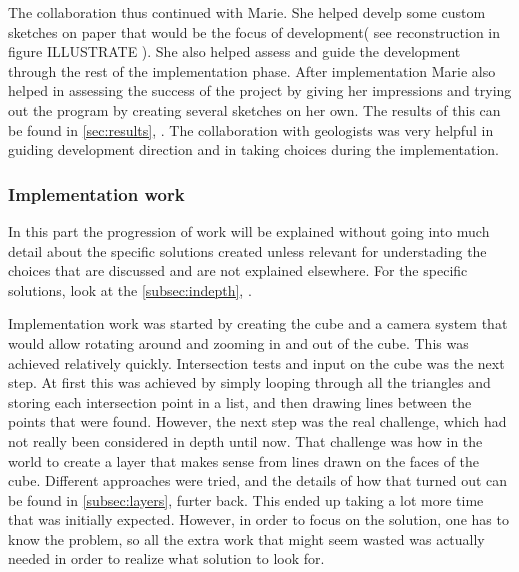 \documentclass[a4paper,12pt]{article}
\newcommand{\secref}[1]{\autoref{#1}, \nameref{#1}}
\begin{document}
The collaboration thus continued with Marie. She helped develp some custom sketches on paper that would be the focus of development( see reconstruction in figure ILLUSTRATE ). She also helped assess and guide the development through the rest of the implementation phase. After implementation Marie also helped in assessing the success of the project by giving her impressions and trying out the program by creating several sketches on her own. The results of this can be found in \secref{sec:results}. The collaboration with geologists was very helpful in guiding development direction and in taking choices during the implementation.

\subsubsection{Implementation work}

In this part the progression of work will be explained without going into much detail about the specific solutions created unless relevant for understading the choices that are discussed and are not explained elsewhere. For the specific solutions, look at the \secref{subsec:indepth}.

Implementation work was started by creating the cube and a camera system that would allow rotating around and zooming in and out of the cube. This was achieved relatively quickly. Intersection tests and input on the cube was the next step. At first this was achieved by simply looping through all the triangles and storing each intersection point in a list, and then drawing lines between the points that were found. However, the next step was the real challenge, which had not really been considered in depth until now. That challenge was how in the world to create a layer that makes sense from lines drawn on the faces of the cube. Different approaches were tried, and the details of how that turned out can be found in \secref{subsec:layers} furter back. This ended up taking a lot more time that was initially expected. However, in order to focus on the solution, one has to know the problem, so all the extra work that might seem wasted was actually needed in order to realize what solution to look for.
\end{document}
